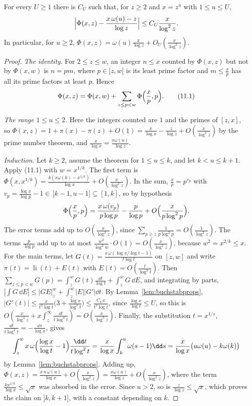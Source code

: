 \begin{theorem}\label{thm:buchstab}
For every $U\ge1$ there is $C_U$ such that, for $z\ge2$ and $x=z^u$ with $1\le u\le U$,
\[
\Bigl|\Phi(x,z)-\frac{x\,\omega(u)-z}{\log z}\Bigr|\le C_U\frac x{\log^2z}.
\]
In particular, for $u\ge2$, $\Phi(x,z)=\omega(u)\frac x{\log z}+O_U(\frac x{\log^2z})$.
\end{theorem}
\begin{proof}
\emph{The identity.} For $2\le z\le w$, an integer $n\le x$ counted by $\Phi(x,z)$ but not by $\Phi(x,w)$ is $n=pm$, where $p\in[z,w[$ is its least prime factor and $m\le\frac xp$ has all its prime factors at least $p$. Hence
\[
\Phi(x,z)=\Phi(x,w)+\sum_{z\le p<w}\Phi\Bigl(\frac xp,p\Bigr).\tag{11.1}
\]

\emph{The range $1\le u\le2$.} Here the integers counted are $1$ and the primes of $[z,x]$, so $\Phi(x,z)=1+\pi(x)-\pi(z)+O(1)=\frac x{\log x}-\frac z{\log z}+O(\frac x{\log^2z})$ by the prime number theorem, and $\frac x{\log x}=\frac{x\omega(u)}{\log z}$.

\emph{Induction.} Let $k\ge2$, assume the theorem for $1\le u\le k$, and let $k<u\le k+1$. Apply (11.1) with $w=x^{1/k}$. The first term is $\Phi(x,x^{1/k})=\frac{k(x\omega(k)-x^{1/k})}{\log x}+O(\frac x{\log^2z})$. In the sum, $\frac xp=p^{v_p}$ with $v_p=\frac{\log x}{\log p}-1\in\,]k-1,u-1]\subseteq[1,k]$, so by hypothesis
\[
\Phi\Bigl(\frac xp,p\Bigr)=\frac{x\,\omega(v_p)}{p\log p}-\frac p{\log p}+O\Bigl(\frac x{p\log^2p}\Bigr).
\]
The error terms add up to $O(\frac x{\log^2z})$, since $\sum_{p\ge z}\frac1{p\log^2p}=O(\frac1{\log^2z})$. The terms $\frac p{\log p}$ add up to at most $\frac{w^2}{\log^2w}\cdot O(1)=O(\frac x{\log^2z})$, because $w^2=x^{2/k}\le x$. For the main terms, let $G(t)=\frac{x\,\omega(\log x/\log t-1)}{t\log t}$ on $[z,w]$ and write $\pi(t)=\operatorname{li}(t)+E(t)$ with $E(t)=O(\frac t{\log^3t})$. Then $\sum_{z\le p<w}G(p)=\int_z^wG(t)\frac{\dd t}{\log t}+\int_z^wG\,\dd E$, and integrating by parts, $|\int G\,\dd E|\le|GE|_z^w+\int_z^w|E||G'|\dd t$. By Lemma~\ref{lem:buchstabprops}, $|G'(t)|\le\frac{x}{t^2\log t}\bigl(3+\frac{\log x}{\log^2t}\bigr)\le\frac{C_Ux}{t^2\log t}$, since $\frac{\log x}{\log t}\le U$, so this is $O(\frac x{\log^4z}+x\int_z^\infty\frac{\dd t}{t\log^4t})=O(\frac x{\log^3z})$. Finally, the substitution $t=x^{1/s}$, $\frac{\dd t}{t\log^2t}=-\frac{\dd s}{\log x}$, gives
\[
\int_z^wx\,\omega\Bigl(\frac{\log x}{\log t}-1\Bigr)\frac{\dd t}{t\log^2t}=\frac x{\log x}\int_k^u\omega(s-1)\dd s=\frac x{\log x}\bigl(u\omega(u)-k\omega(k)\bigr)
\]
by Lemma~\ref{lem:buchstabprops}. Adding up, $\Phi(x,z)=\frac{x\,u\,\omega(u)}{\log x}+O(\frac x{\log^2z})=\frac{x\omega(u)}{\log z}+O(\frac x{\log^2z})$, where the term $\frac{kx^{1/k}}{\log x}\le\sqrt x$ was absorbed in the error. Since $u>2$, so is $\frac z{\log z}\le\sqrt x$, which proves the claim on $]k,k+1]$, with a constant depending on $k$.
\end{proof}

